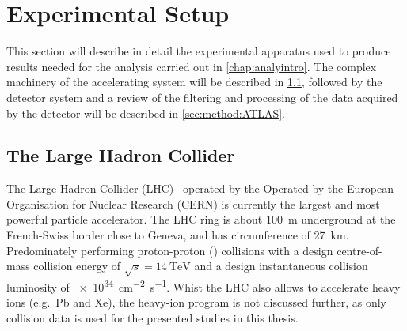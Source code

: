 \chapter{Experimental Setup}\label{chap:expSetup}
This section will describe in detail the experimental apparatus used to produce results needed for 
the analysis carried out in \cref{chap:analyintro}. The complex machinery of the accelerating system will be described in \cref{sec:method:LHC}, followed by the detector system and a review of the filtering and processing of the data acquired by the detector will be described in \cref{sec:method:ATLAS}.

\section{The Large Hadron Collider}\label{sec:method:LHC}
The Large Hadron Collider (LHC)~\cite{LHC} operated by the Operated by the European Organisation 
for Nuclear Research (CERN) is currently the largest and most powerful particle accelerator. 
The LHC ring is about \SI{100}{\metre} underground at the French-Swiss border close to Geneva, and 
has circumference of \SI{27}{\kilo\metre}. Predominately performing proton-proton (\protonproton) 
collisions with a design centre-of-mass collision energy of $\sqrt{s} = \SI{14}{\tera\electronvolt}$ 
and a design instantaneous collision luminosity of \SI{e34}{\centi\metre^{-2} \second^{-1}}.
Whist the LHC also allows to accelerate heavy ions (e.g.\ Pb and Xe), the heavy-ion program is not 
discussed further, as only \protonproton collision data is used for the presented studies in this 
thesis. 

